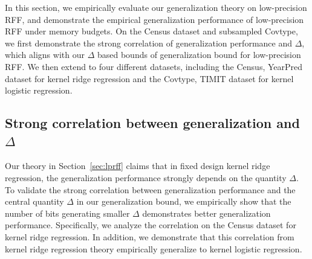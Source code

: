 In this section, we empirically evaluate our generalization theory on low-precision RFF, and demonstrate the empirical generalization performance of low-precision RFF under memory budgets. On the Census dataset and subsampled Covtype, we first demonstrate the strong correlation of generalization performance and $\Delta$, which aligns with our $\Delta$ based bounds of generalization bound for low-precision RFF. We then extend to four different datasets, including the Census, YearPred dataset for kernel ridge regression and the Covtype, TIMIT dataset for kernel logistic regression. 

\subsection{Strong correlation between generalization and $\Delta$}
Our theory in Section~\ref{sec:lprff} claims that in fixed design kernel ridge regression, the generalization performance strongly depends on the quantity $\Delta$.
To validate the strong correlation between generalization performance and the central quantity $\Delta$ in our generalization bound, we empirically show that the number of bits generating smaller $\Delta$ demonstrates better generalization performance. 
Specifically, we analyze the correlation on the Census dataset for kernel ridge regression. In addition, we demonstrate that this correlation from kernel ridge regression theory empirically generalize to kernel logistic regression. 

